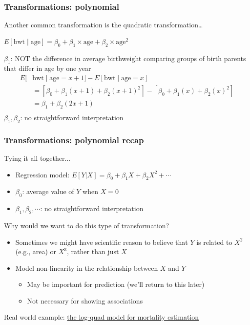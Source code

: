 \documentclass[10pt,t]{beamer}
\begin{document}
\begin{frame}
\frametitle{Transformations: polynomial}
Another common transformation is the quadratic transformation\dots
\begin{center} $E[\text{bwt} \mid \text{age}] = \beta_0 + \beta_1 \times \text{age} + \beta_2 \times \text{age}^2$ \end{center}

$\beta_1$: \color{red} NOT \color{black} the difference in average birthweight comparing groups of birth parents that differ in age by one year \pause
\begin{align*}
E[& \text{bwt} \mid \text{age} = x + 1] -E[\text{bwt} \mid \text{age} = x]\\
& = \left[\beta_0 + \beta_1 (x+1) + \beta_2(x+1)^2\right] -\left[\beta_0 + \beta_1 (x) + \beta_2(x)^2\right]\\
& = \beta_1 + \beta_2(2x+1) \\
\end{align*}\pause
\color{blue} $\beta_1,\beta_2$: no straightforward interpretation \color{black}
\end{frame}

\begin{frame}
\frametitle{Transformations: polynomial recap}
Tying it all together...
\begin{itemize}
	\item \color{blue} Regression model: \color{black} $E[Y|X] = \beta_0 + \beta_1X + \beta_2 X^2 + \cdots$
	\item \color{blue} $\beta_0$: \color{black} average value of $Y$ when $X = 0$
	\item \color{blue} $\beta_1, \beta_2, \cdots$: \color{black} no straightforward interpretation
\end{itemize}\pause

\vspace{0.3cm}

Why would we want to do this type of transformation?
\begin{itemize}
	\item Sometimes we might have scientific reason to believe that $Y$ is related to $X^2$ (e.g., area) or $X^3$, rather than just $X$
	\item Model non-linearity in the relationship between $X$ and $Y$
	\begin{itemize}
		\item May be important for prediction (we'll return to this later)
		\item Not necessary for showing associations 
	\end{itemize}
\end{itemize}

\vspace{0.3cm}

Real world example:  \href{https://www.ncbi.nlm.nih.gov/pmc/articles/PMC4046865/}{\color{cyan} the log-quad model for mortality estimation}

\end{frame}
\end{document}
